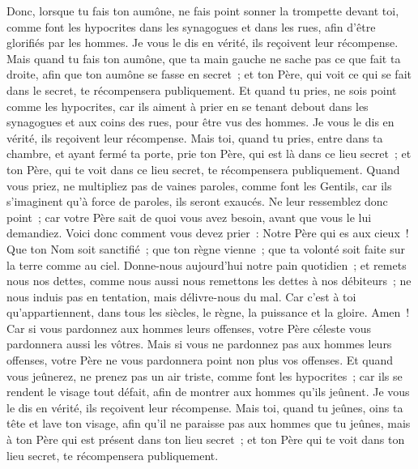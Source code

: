 \begin{multicols}{2}
Donc, lorsque tu fais ton aumône, ne fais point sonner la trompette devant toi, comme font les hypocrites dans les synagogues et dans les rues, afin d'être glorifiés par les hommes. Je vous le dis en vérité, ils reçoivent leur récompense.
Mais quand tu fais ton aumône, que ta main gauche ne sache pas ce que fait ta droite,
afin que ton aumône se fasse en secret~; et ton Père, qui voit ce qui se fait dans le secret, te récompensera publiquement.
Et quand tu pries, ne sois point comme les hypocrites, car ils aiment à prier en se tenant debout dans les synagogues et aux coins des rues, pour être vus des hommes. Je vous le dis en vérité, ils reçoivent leur récompense.
Mais toi, quand tu pries, entre dans ta chambre, et ayant fermé ta porte, prie ton Père, qui est là dans ce lieu secret~; et ton Père, qui te voit dans ce lieu secret, te récompensera publiquement.
Quand vous priez, ne multipliez pas de vaines paroles, comme font les Gentils, car ils s'imaginent qu'à force de paroles, ils seront exaucés.
Ne leur ressemblez donc point~; car votre Père sait de quoi vous avez besoin, avant que vous le lui demandiez.
Voici donc comment vous devez prier~: Notre Père qui es aux cieux~! Que ton Nom soit sanctifié~;
que ton règne vienne~; que ta volonté soit faite sur la terre comme au ciel.
Donne-nous aujourd'hui notre pain quotidien~;
et remets nous nos dettes, comme nous aussi nous remettons les dettes à nos débiteurs~;
ne nous induis pas en tentation, mais délivre-nous du mal. Car c'est à toi qu'appartiennent, dans tous les siècles, le règne, la puissance et la gloire. Amen~!
Car si vous pardonnez aux hommes leurs offenses, votre Père céleste vous pardonnera aussi les vôtres.
Mais si vous ne pardonnez pas aux hommes leurs offenses, votre Père ne vous pardonnera point non plus vos offenses.
Et quand vous jeûnerez, ne prenez pas un air triste, comme font les hypocrites~; car ils se rendent le visage tout défait, afin de montrer aux hommes qu'ils jeûnent. Je vous le dis en vérité, ils reçoivent leur récompense.
Mais toi, quand tu jeûnes, oins ta tête et lave ton visage,
afin qu'il ne paraisse pas aux hommes que tu jeûnes, mais à ton Père qui est présent dans ton lieu secret~; et ton Père qui te voit dans ton lieu secret, te récompensera publiquement.

\end{multicols}
